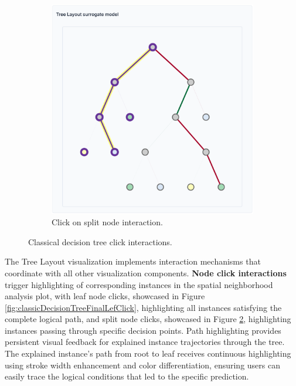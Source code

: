 \begin{figure}
\begin{subfigure}[c]{0.48\linewidth}
        \includegraphics[width=\linewidth]{images/classicalDecisionTreeFinalSplitInteraction.png}
        \caption{Click on split node interaction.}
        \label{fig:classicDecisionTreeFinalSplitClick}
    \end{subfigure}
    \caption{Classical decision tree click interactions.}
\end{figure}

The Tree Layout visualization implements interaction mechanisms that coordinate with all other visualization components. \textbf{Node click interactions} trigger highlighting of corresponding instances in the spatial neighborhood analysis plot, with leaf node clicks, showcased in Figure \ref{fig:classicDecisionTreeFinalLefClick}, highlighting all instances satisfying the complete logical path, and split node clicks, showcased in Figure \ref{fig:classicDecisionTreeFinalSplitClick}, highlighting instances passing through specific decision points.
%
Path highlighting provides persistent visual feedback for explained instance trajectories through the tree. The explained instance's path from root to leaf receives continuous highlighting using stroke width enhancement and color differentiation, ensuring users can easily trace the logical conditions that led to the specific prediction.

